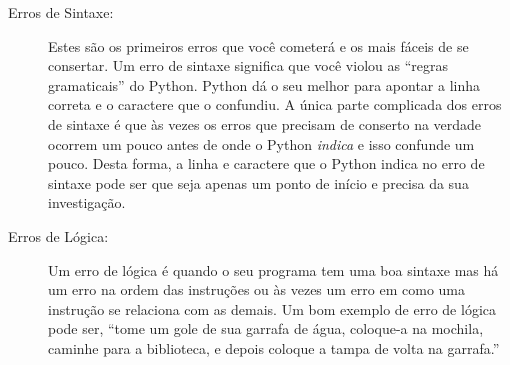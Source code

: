 \begin{description}
%

\item[Erros de Sintaxe:] Estes são os primeiros erros que você cometerá e os mais
fáceis de se consertar. Um erro de sintaxe significa que você violou as ``regras gramaticais''
do Python. Python dá o seu melhor para apontar a linha correta e o caractere que o
confundiu. A única parte complicada dos erros de sintaxe é que às vezes os erros
que precisam de conserto na verdade ocorrem um pouco antes de onde o Python {\em indica}
e isso confunde um pouco. Desta forma, a linha e  caractere que o Python indica
no erro de sintaxe pode ser que seja apenas um ponto de início e precisa da sua 
investigação. 
%

\item[Erros de Lógica:] Um erro de lógica é quando o seu programa tem uma boa sintaxe mas há
um erro na ordem das instruções ou às vezes um erro em como uma instrução se relaciona com
as demais. Um bom exemplo de erro de lógica pode ser, ``tome um gole de sua garrafa de água, coloque-a
na mochila, caminhe para a biblioteca, e depois coloque a tampa de volta na garrafa.''
%


\end{description}
